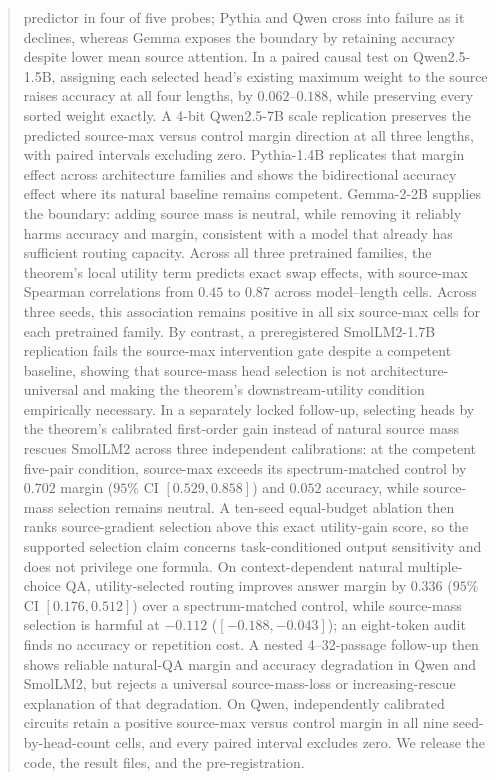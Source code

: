\documentclass[letterpaper]{article} %
\begin{document}
\begin{abstract}
predictor in four of five probes; Pythia and Qwen cross into failure as it declines, whereas Gemma exposes
the boundary by retaining accuracy despite lower mean source attention.
In a paired causal test on Qwen2.5-1.5B, assigning each selected head's existing maximum weight to the
source raises accuracy at all four lengths, by $0.062$--$0.188$, while preserving every sorted weight exactly.
A 4-bit Qwen2.5-7B scale replication preserves the predicted source-max versus control margin direction at
all three lengths, with paired intervals excluding zero.
Pythia-1.4B replicates that margin effect across architecture families and shows the bidirectional accuracy
effect where its natural baseline remains competent.
Gemma-2-2B supplies the boundary: adding source mass is neutral, while removing it reliably harms accuracy
and margin, consistent with a model that already has sufficient routing capacity.
Across all three pretrained families, the theorem's local utility term predicts exact swap effects, with
source-max Spearman correlations from $0.45$ to $0.87$ across model--length cells.
Across three seeds, this association remains positive in all six source-max cells for each pretrained family.
By contrast, a preregistered SmolLM2-1.7B replication fails the source-max intervention gate despite a
competent baseline, showing that source-mass head selection is not architecture-universal and making the
theorem's downstream-utility condition empirically necessary.
In a separately locked follow-up, selecting heads by the theorem's calibrated first-order gain instead of
natural source mass rescues SmolLM2 across three independent calibrations: at the competent five-pair
condition, source-max exceeds its spectrum-matched control by $0.702$ margin
($95\%$ CI $[0.529,0.858]$) and $0.052$ accuracy, while source-mass selection remains neutral.
A ten-seed equal-budget ablation then ranks source-gradient selection above this exact utility-gain score,
so the supported selection claim concerns task-conditioned output sensitivity and does not privilege one formula.
On context-dependent natural multiple-choice QA, utility-selected routing improves answer margin by $0.336$
($95\%$ CI $[0.176,0.512]$) over a spectrum-matched control, while source-mass selection is harmful at
$-0.112$ ($[-0.188,-0.043]$); an eight-token audit finds no accuracy or repetition cost.
A nested 4--32-passage follow-up then shows reliable natural-QA margin and accuracy degradation in Qwen
and SmolLM2, but rejects a universal source-mass-loss or increasing-rescue explanation of that degradation.
On Qwen, independently calibrated circuits retain a positive source-max versus control margin in all nine
seed-by-head-count cells, and every paired interval excludes zero.
We release the code, the result files, and the pre-registration.
\end{abstract}
\end{document}
